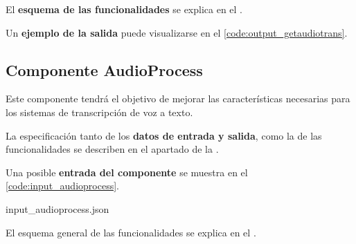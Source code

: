 \documentclass[../main.tex]{subfiles}
\begin{document}
El \textbf{esquema de las funcionalidades} se explica en el .

Un \textbf{ejemplo de la salida} puede visualizarse en el \autoref{code:output_getaudiotrans}.



\subsection{Componente AudioProcess}\label{subsec:impl_audioprocess}
Este componente tendrá el objetivo de mejorar las características necesarias para los sistemas de transcripción de voz a texto.

La especificación tanto de los \textbf{datos de entrada y salida}, como la de las funcionalidades se describen en el apartado  de la .

Una posible \textbf{entrada del componente} se muestra en el \autoref{code:input_audioprocess}.

                {input_audioprocess.json}


El esquema general de las funcionalidades se explica en el .
\end{document}
